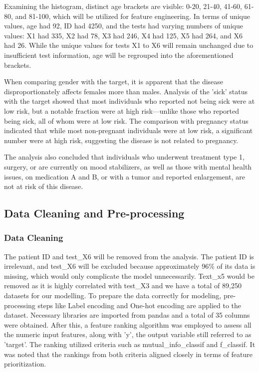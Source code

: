 \documentclass[a4paper]{article}
\begin{document}
Examining the histogram, distinct age brackets are visible: 0-20, 21-40, 41-60, 61-80, and 81-100, which will be utilized for feature engineering. In terms of unique values, age had 92, ID had 4250, and the tests had varying numbers of unique values: X1 had 335, X2 had 78, X3 had 246, X4 had 125, X5 had 264, and X6 had 26. While the unique values for tests X1 to X6 will remain unchanged due to insufficient test information, age will be regrouped into the aforementioned brackets.

When comparing gender with the target, it is apparent that the disease disproportionately affects females more than males. Analysis of the 'sick' status with the target showed that most individuals who reported not being sick were at low risk, but a notable fraction were at high risk—unlike those who reported being sick, all of whom were at low risk. The comparison with pregnancy status indicated that while most non-pregnant individuals were at low risk, a significant number were at high risk, suggesting the disease is not related to pregnancy.

The analysis also concluded that individuals who underwent treatment type 1, surgery, or are currently on mood stabilizers, as well as those with mental health issues, on medication A and B, or with a tumor and reported enlargement, are not at risk of this disease. 

\subsection{Data Cleaning and Pre-processing}
\subsubsection{Data Cleaning}
The patient ID and test\_X6 will be removed from the analysis. The patient ID is irrelevant, and test\_X6 will be excluded because approximately 96\% of its data is missing, which would only complicate the model unnecessarily.
Text\_x5 would be removed as it is highly correlated with test\_X3 and we have a total of 89,250 datasets for our modelling. To prepare the data correctly for modeling, pre-processing steps like Label encoding and One-hot encoding are applied to the dataset. Necessary libraries are imported from pandas and a total of 35 columns were obtained. After this, a feature ranking algorithm was employed to assess all the numeric input features, along with 'y', the output variable still referred to as 'target'. The ranking utilized criteria such as mutual\_info\_classif and f\_classif. It was noted that the rankings from both criteria aligned closely in terms of feature prioritization.
\end{document}
